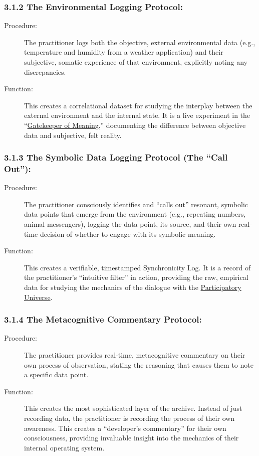 \documentclass{article}
\begin{document}
\subsubsection*{3.1.2 The Environmental Logging Protocol:}
\begin{description}
    \item[Procedure:] The practitioner logs both the objective, external environmental data (e.g., temperature and humidity from a weather application) and their subjective, somatic experience of that environment, explicitly noting any discrepancies.
    \item[Function:] This creates a correlational dataset for studying the interplay between the external environment and the internal state. It is a live experiment in the ``\hyperlink{gloss:gatekeeper_of_meaning}{Gatekeeper of Meaning},'' documenting the difference between objective data and subjective, felt reality.
\end{description}

\subsubsection*{3.1.3 The Symbolic Data Logging Protocol (The ``Call Out''):}
\begin{description}
    \item[Procedure:] The practitioner consciously identifies and ``calls out'' resonant, symbolic data points that emerge from the environment (e.g., repeating numbers, animal messengers), logging the data point, its source, and their own real-time decision of whether to engage with its symbolic meaning.
    \item[Function:] This creates a verifiable, timestamped Synchronicity Log. It is a record of the practitioner's ``intuitive filter'' in action, providing the raw, empirical data for studying the mechanics of the dialogue with the \hyperlink{gloss:participatory_universe}{Participatory Universe}.
\end{description}

\subsubsection*{3.1.4 The Metacognitive Commentary Protocol:}
\begin{description}
    \item[Procedure:] The practitioner provides real-time, metacognitive commentary on their own process of observation, stating the reasoning that causes them to note a specific data point.
    \item[Function:] This creates the most sophisticated layer of the archive. Instead of just recording data, the practitioner is recording the process of their own awareness. This creates a ``developer's commentary'' for their own consciousness, providing invaluable insight into the mechanics of their internal operating system.
\end{description}
\end{document}

